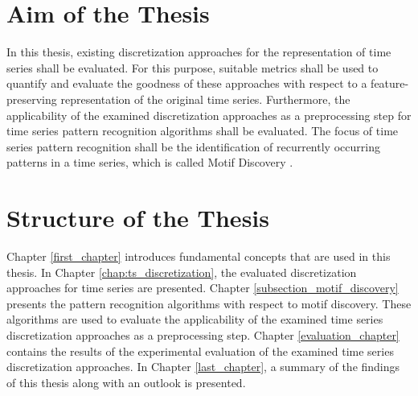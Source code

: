 \section{Aim of the Thesis}
In this thesis, existing discretization approaches for the representation of time series shall be evaluated. For this purpose, suitable metrics shall be used to quantify and evaluate the goodness of these approaches with respect to a feature-preserving representation of the original time series. \newline
Furthermore, the applicability of the examined discretization approaches as a preprocessing step for time series pattern recognition algorithms shall be evaluated. The focus of time series pattern recognition shall be the identification of recurrently occurring patterns in a time series, which is called Motif Discovery \cite{Survey_Esling}.
\section{Structure of the Thesis}
Chapter \ref{first_chapter} introduces fundamental concepts that are used in this thesis. In Chapter \ref{chap:ts_discretization}, the evaluated discretization approaches for time series are presented. Chapter \ref{subsection_motif_discovery} presents the pattern recognition algorithms with respect to motif discovery. These algorithms are used to evaluate the applicability of the examined time series discretization approaches as a preprocessing step. Chapter \ref{evaluation_chapter} contains the results of the experimental evaluation of the examined time series discretization approaches. In Chapter \ref{last_chapter}, a summary of the findings of this thesis along with an outlook is presented.


